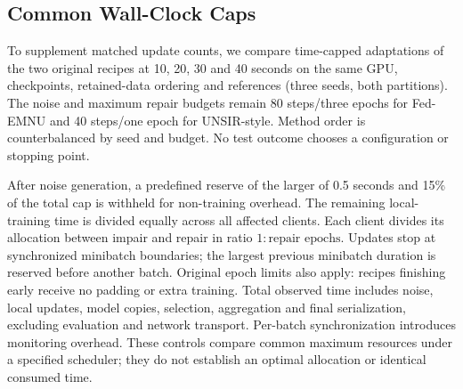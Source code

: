 \documentclass[software,article,submit,moreauthors]{Definitions/mdpi}
\begin{document}
\subsection{Common Wall-Clock Caps}
\label{sec:walltime}
To supplement matched update counts, we compare time-capped adaptations of the
two original recipes at 10, 20, 30 and 40 seconds on the same GPU, checkpoints,
retained-data ordering and references (three seeds, both partitions). The
noise and maximum repair budgets remain 80 steps/three epochs for Fed-EMNU and
40 steps/one epoch for UNSIR-style. Method order is counterbalanced by seed
and budget. No test outcome chooses a configuration or stopping point.

After noise generation, a predefined reserve of the larger of 0.5 seconds and
15\% of the total cap is withheld for non-training overhead. The remaining
local-training time is divided equally across all affected clients. Each
client divides its allocation between impair and repair in ratio
$1:\text{repair epochs}$. Updates stop at synchronized minibatch boundaries;
the largest previous minibatch duration is reserved before another batch.
Original epoch limits also apply: recipes finishing early receive no padding
or extra training. Total observed time includes noise, local updates, model
copies, selection, aggregation and final serialization, excluding evaluation
and network transport. Per-batch synchronization introduces monitoring overhead.
These controls compare common maximum resources under a specified scheduler;
they do not establish an optimal allocation or identical consumed time.
\end{document}
